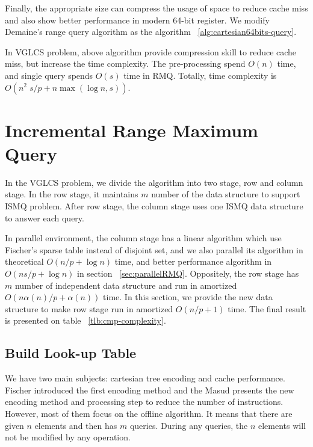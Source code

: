 Finally, the appropriate size can compress the usage of space to
reduce cache miss and also show better performance in modern 64-bit
register.  We modify Demaine's range query algorithm as the algorithm
~\ref{alg:cartesian64bits-query}.





In VGLCS problem, above algorithm provide compression skill to reduce
cache miss, but increase the time complexity.  The pre-processing
spend $O(n)$ time, and single query spends $O(s)$ time in RMQ.
Totally, time complexity is $O(n^2 \; s / p + n \max(\log n, s))$.



\section{Incremental Range Maximum Query}

In the VGLCS problem, we divide the algorithm into two stage, row and
column stage.  In the row stage, it maintains $m$ number of the data
structure to support ISMQ problem.  After row stage, the column stage
uses one ISMQ data structure to answer each query.

In parallel environment, the column stage has a linear algorithm which
use Fischer's sparse table instead of disjoint set, and we also
parallel its algorithm in theoretical $O(n / p + \log n)$ time, and
better performance algorithm in $O(n s / p + \log n)$ in section
~\ref{sec:parallelRMQ}.  Oppositely, the row stage has $m$ number of
independent data structure and run in amortized $O(n \alpha(n) / p +
\alpha(n))$ time.  In this section, we provide the new data structure
to make row stage run in amortized $O(n / p + 1)$ time.  The final
result is presented on table ~\ref{tlb:cmp-complexity}.



\subsection{Build Look-up Table}

We have two main subjects: cartesian tree encoding and cache
performance.  Fischer introduced the first encoding method and the
Masud presents the new encoding method and processing step to reduce
the number of instructions.  However, most of them focus on the
offline algorithm.  It means that there are given $n$ elements and
then has $m$ queries.  During any queries, the $n$ elements will not
be modified by any operation.

